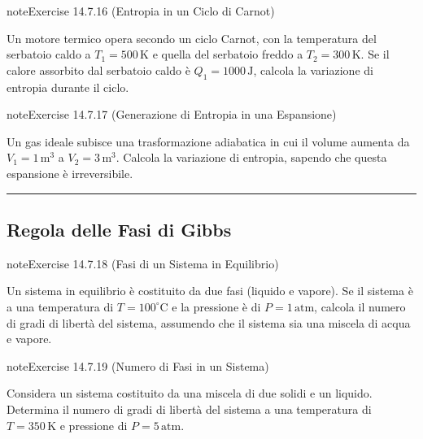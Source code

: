 \documentclass[letterpaper,10pt,italian]{jupyterBook}
\begin{document}
\begin{sphinxadmonition}{note}{Exercise 14.7.16 (Entropia in un Ciclo di Carnot)}



\sphinxAtStartPar
Un motore termico opera secondo un ciclo Carnot, con la temperatura del serbatoio caldo a \(T_1 = 500 \, \text{K}\) e quella del serbatoio freddo a \(T_2 = 300 \, \text{K}\). Se il calore assorbito dal serbatoio caldo è \(Q_1 = 1000 \, \text{J}\), calcola la variazione di entropia durante il ciclo.
\end{sphinxadmonition}
 \label{exercise:ch/thermodynamics/principles-problems-exercise-16}

\begin{sphinxadmonition}{note}{Exercise 14.7.17 (Generazione di Entropia in una Espansione)}



\sphinxAtStartPar
Un gas ideale subisce una trasformazione adiabatica in cui il volume aumenta da \(V_1 = 1 \, \text{m}^3\) a \(V_2 = 3 \, \text{m}^3\). Calcola la variazione di entropia, sapendo che questa espansione è irreversibile.
\end{sphinxadmonition}


\bigskip\hrule\bigskip



\subsection{Regola delle Fasi di Gibbs}
\label{\detokenize{ch/thermodynamics/principles-problems:regola-delle-fasi-di-gibbs}} \label{exercise:ch/thermodynamics/principles-problems-exercise-17}

\begin{sphinxadmonition}{note}{Exercise 14.7.18 (Fasi di un Sistema in Equilibrio)}



\sphinxAtStartPar
Un sistema in equilibrio è costituito da due fasi (liquido e vapore). Se il sistema è a una temperatura di \(T = 100^\circ \text{C}\) e la pressione è di \(P = 1 \, \text{atm}\), calcola il numero di gradi di libertà del sistema, assumendo che il sistema sia una miscela di acqua e vapore.
\end{sphinxadmonition}
 \label{exercise:ch/thermodynamics/principles-problems-exercise-18}

\begin{sphinxadmonition}{note}{Exercise 14.7.19 (Numero di Fasi in un Sistema)}



\sphinxAtStartPar
Considera un sistema costituito da una miscela di due solidi e un liquido. Determina il numero di gradi di libertà del sistema a una temperatura di \(T = 350 \, \text{K}\) e pressione di \(P = 5 \, \text{atm}\).
\end{sphinxadmonition}
 \label{exercise:ch/thermodynamics/principles-problems-exercise-19}
\end{document}
